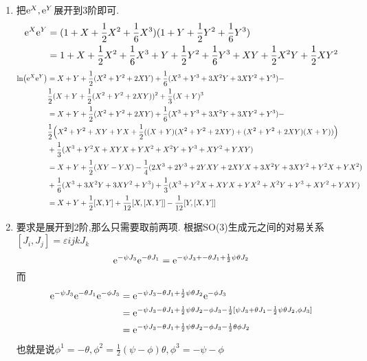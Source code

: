 \begin{solution}
    \begin{enumerate}[label=(\arabic*)]
    \item 把$\mathrm e^{X},\mathrm e^{Y}$展开到3阶即可.
    \begin{align*}
        \mathrm e^{X}\mathrm e^{Y}&=(1+X+\frac12X^2+\frac16X^3)(1+Y+\frac12Y^2+\frac16Y^3)\\&=
        1+X+\frac12X^2+\frac16X^3+Y+\frac12Y^2+\frac16Y^3+XY+\frac12X^2Y+\frac12XY^2
    \end{align*}
    \begin{align*}
        \ln(\mathrm e^{X}\mathrm e^{Y})&=X+Y+\frac12(X^2+Y^2+2XY)+\frac16(X^3+Y^3+3X^2Y+3XY^2+Y^3)-\\&\frac12(X+Y+\frac12(X^2+Y^2+2XY))^2+\frac13(X+Y)^3\\&=X+Y+\frac12(X^2+Y^2+2XY)+\frac16(X^3+Y^3+3X^2Y+3XY^2+Y^3)-\\&\frac12\Big(X^2+Y^2+XY+YX+\frac12((X+Y)(X^2+Y^2+2XY)+(X^2+Y^2+2XY)(X+Y))\Big)\\&+\frac13(X^3+Y^2X+XYX+YX^2+X^2Y+Y^3+XY^2+YXY)\\&=X+Y+\frac12(XY-YX)-\frac14(2X^3+2Y^3+2YXY+2XYX+3X^2Y+3XY^2+Y^2X+YX^2)\\&+\frac16(X^3+3X^2Y+3XY^2+Y^3)+\frac13(X^3+Y^2X+XYX+YX^2+X^2Y+Y^3+XY^2+YXY)\\&=X+Y+\frac{1}{2}[X,Y]+\frac{1}{12}[X,[X,Y]]-\frac{1}{12}[Y,[X,Y]]
    \end{align*}

    \item 要求是展开到2阶,那么只需要取前两项.
    根据SO(3)生成元之间的对易关系$[J_i,J_j]=\varepsilon{ijk}J_k$
    $$\mathrm e^{-\psi J_3}\mathrm e^{-\theta J_1}=\mathrm e^{-\psi J_3+-\theta J_1+\frac12\psi\theta J_2}$$
    而
    \begin{align*}
        \mathrm e^{-\psi J_3}\mathrm e^{-\theta J_1}\mathrm e^{-\phi J_3}&=\mathrm e^{-\psi J_3-\theta J_1+\frac12\psi\theta J_2}\mathrm e^{-\phi J_3}\\&=\mathrm e^{-\psi J_3-\theta J_1+\frac12\psi\theta J_2-\phi J_3-\frac12[\psi J_3+\theta J_1-\frac12\psi\theta J_2,\phi J_3]}\\&=\mathrm e^{-\psi J_3-\theta J_1+\frac12\psi\theta J_2-\phi J_3-\frac12\theta\phi J_2}
    \end{align*}
    也就是说$\phi^1=-\theta,\phi^2=\frac{1}{2}(\psi-\phi)\theta,\phi^3=-\psi-\phi$
    \end{enumerate}    
\end{solution}

